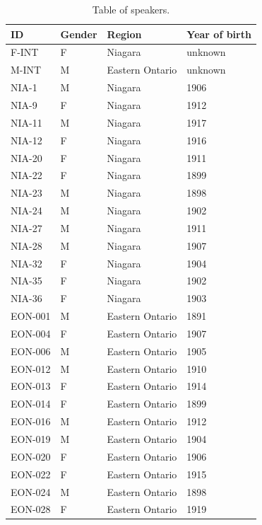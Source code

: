 \documentclass[11pt]{article}
\begin{document}
\begin{table}[ht!]
    \centering
    \begin{tabular}{llll}
        \toprule
        ID & Gender & Region  & Year of birth \\
        \midrule
        F-INT   & F & Niagara         & unknown \\
        M-INT   & M & Eastern Ontario & unknown \\
        NIA-1   & M & Niagara         & 1906    \\
        NIA-9   & F & Niagara         & 1912    \\
        NIA-11  & M & Niagara         & 1917    \\
        NIA-12  & F & Niagara         & 1916    \\
        NIA-20  & F & Niagara         & 1911    \\
        NIA-22  & F & Niagara         & 1899    \\
        NIA-23  & M & Niagara         & 1898    \\
        NIA-24  & M & Niagara         & 1902    \\
        NIA-27  & M & Niagara         & 1911    \\
        NIA-28  & M & Niagara         & 1907    \\
        NIA-32  & F & Niagara         & 1904    \\
        NIA-35  & F & Niagara         & 1902    \\
        NIA-36  & F & Niagara         & 1903    \\
        EON-001 & M & Eastern Ontario & 1891    \\
        EON-004 & F & Eastern Ontario & 1907    \\
        EON-006 & M & Eastern Ontario & 1905    \\
        EON-012 & M & Eastern Ontario & 1910    \\
        EON-013 & F & Eastern Ontario & 1914    \\
        EON-014 & F & Eastern Ontario & 1899    \\
        EON-016 & M & Eastern Ontario & 1912    \\
        EON-019 & M & Eastern Ontario & 1904    \\
        EON-020 & F & Eastern Ontario & 1906    \\
        EON-022 & F & Eastern Ontario & 1915    \\
        EON-024 & M & Eastern Ontario & 1898    \\
        EON-028 & F & Eastern Ontario & 1919    \\
        \bottomrule
    \end{tabular}
    \caption{Table of speakers.}\label{tab:speakers}
\end{table}
\end{document}
